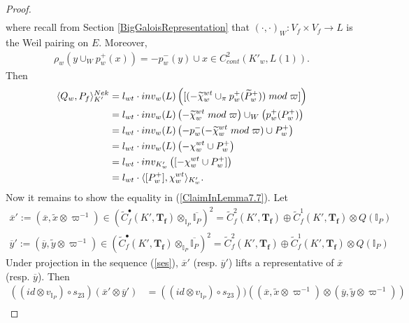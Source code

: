 \documentclass[reqno,10pt]{amsart}
\newcommand{\I}{\mathbb{I}}
\newcommand{\f}{\mathbf{f}}
\newcommand{\T}{\mathbf{T}}
\newcommand{\ip}{\I_P}
\newcommand{\vp}{\varpi}
\newcommand{\ox}{\overline{x}}
\newcommand{\oy}{\overline{y}}
\newcommand{\wx}{\widetilde{x}}
\newcommand{\wy}{\widetilde{y}}
\theoremstyle{plain}
\theoremstyle{definition}
\begin{document}
\begin{proof}
\begin{align*}
    \end{align*}
    where recall from Section \ref{BigGaloisRepresentation} that $(\cdot,\cdot)_W : V_f \times V_f \rightarrow L$ is the Weil pairing on $E$.
    Moreover,
    \begin{align*}
        \rho_w(y \cup_W p_w^+(x)) = -p_w^-(y) \cup x \in C^2_{cont}(K'_w,L(1)).
    \end{align*}
    Then
    \begin{align*}
        \langle Q_w,P_f \rangle^{Nek}_{K'} & = l_{wt} \cdot inv_w(L)\left([(-\widetilde{\chi}_w^{wt} \cup_\pi p_w^+(\widetilde{P}_w^+)) \hspace{1mm} mod \hspace{1mm} \vp] \right) \\
        & = l_{wt} \cdot inv_w(L)\left(-\widetilde{\chi}_w^{wt} \hspace{1mm} mod \hspace{1mm} \vp \right) \cup_W \left(p_w^+(P_w^+) \right) \\
        & = l_{wt} \cdot inv_w(L)\left(-p_w^-(-\widetilde{\chi}_w^{wt} \hspace{1mm} mod \hspace{1mm} \vp) \cup P_w^+ \right) \\
        & = l_{wt} \cdot inv_w(L)\left(-\chi_w^{wt} \cup P_w^+ \right) \\
        & = l_{wt} \cdot inv_{K'_w}\left([-\chi_w^{wt} \cup P_w^+] \right) \\
        & = l_{wt} \cdot \langle [P_w^+],\chi_w^{wt} \rangle_{K'_w}.
    \end{align*}
    Now it remains to show the equality in (\ref{ClaimInLemma7.7}). Let
    \begin{align*}
        \ox' := (\ox, \wx \otimes \vp^{-1}) \in \left(\widetilde{C}^\bullet_f(K',\T_\f) \otimes_{\I_P} \overline{\I_P} \right)^2 = \widetilde{C}^2_f(K',\T_\f) \oplus \widetilde{C}^1_f(K',\T_\f) \otimes Q(\I_P)\\
        \oy' := (\oy, \wy \otimes \vp^{-1}) \in \left(\widetilde{C}^\bullet_f(K',\T_\f) \otimes_{\I_P} \overline{\I_P} \right)^2 = \widetilde{C}^2_f(K',\T_\f) \oplus \widetilde{C}^1_f(K',\T_\f) \otimes Q(\I_P)
    \end{align*}
    Under projection in the sequence (\ref{ses}), $\ox'$ (resp. $\oy'$) lifts a representative of $\ox$ (resp. $\oy$). Then
    \begin{align*}
        ((id \otimes v_{\ip}) \circ s_{23})(\ox' \otimes \oy') & = ((id \otimes v_{\ip}) \circ s_{23}))((\ox,\wx \otimes \vp^{-1}) \otimes (\oy,\wy \otimes \vp^{-1})) \\

\end{align*}
\end{proof}
\end{document}
